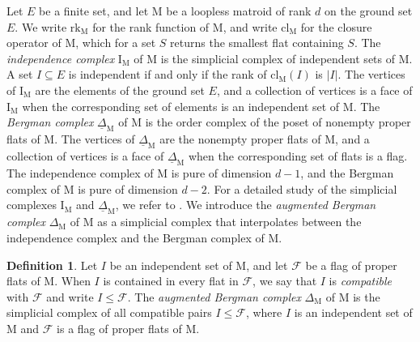\documentclass[11pt,reqno]{amsart}
\theoremstyle{definition}
\newtheorem{definition}[theorem]{Definition}
\theoremstyle{remark}
\renewcommand{\(}{\left(}
\renewcommand{\)}{\right)}
\newcommand{\<}{\left<}
\renewcommand{\>}{\right>}
\begin{document}
Let $E$ be a finite set, and let $\mathrm{M}$ be a loopless matroid of rank $d$ on the ground set $E$.
We write $\text{rk}_\mathrm{M}$ for the rank function of $\mathrm{M}$,
and write $\text{cl}_\mathrm{M}$ for the closure operator of $\mathrm{M}$, which for a set $S$ returns the smallest flat containing $S$.  
The \emph{independence complex} $\mathrm{I}_\mathrm{M}$ of $\mathrm{M}$ is the simplicial complex of independent sets of $\mathrm{M}$.  A set $I\subseteq E$ is independent if and only if the rank of $\text{cl}_{\mathrm{M}}(I)$ is $|I|$.
The vertices of $\mathrm{I}_\mathrm{M}$  are the elements of the ground set $E$, and
a collection of vertices  is a face of $\mathrm{I}_\mathrm{M}$ when the corresponding set of elements is an independent set of $\mathrm{M}$.
The \emph{Bergman complex} $\underline{\Delta}_\mathrm{M}$ of $\mathrm{M}$ is the order complex of the poset of nonempty proper flats of $\mathrm{M}$.
The vertices of $\underline{\Delta}_\mathrm{M}$ are the nonempty proper flats of $\mathrm{M}$, and
a collection of vertices   is a face  of $\underline{\Delta}_\mathrm{M}$ when the corresponding set of flats is a flag.
The independence complex of $\mathrm{M}$ is pure of dimension $d-1$,
and the Bergman complex of $\mathrm{M}$ is pure of dimension $d-2$.
For a detailed study of the simplicial complexes  $\mathrm{I}_\mathrm{M}$ and $\underline{\Delta}_\mathrm{M}$, we refer to  \cite{Bjorner}.
We introduce the \emph{augmented Bergman complex} $\Delta_\mathrm{M}$ of $\mathrm{M}$ as a simplicial complex that interpolates
between the independence complex and the Bergman complex of $\mathrm{M}$.

\begin{definition}
Let $I$ be an independent set of $\mathrm{M}$, and let $\mathscr{F}$ be a flag of proper flats of $\mathrm{M}$.
When $I$ is contained in every flat in $\mathscr{F}$, we say that $I$ is \emph{compatible} with $\mathscr{F}$ and write $I \le \mathscr{F}$.
The \emph{augmented Bergman complex} $\Delta_\mathrm{M}$ of $\mathrm{M}$ is the simplicial complex of 
all compatible pairs  $I \le \mathscr{F}$,
where $I$ is an independent set of $\mathrm{M}$ and $\mathscr{F}$ is a flag of proper flats of $\mathrm{M}$.
\end{definition}
\end{document}
